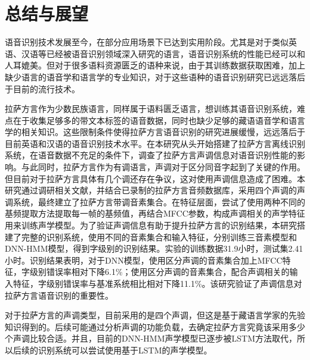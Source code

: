 ﻿%

\chapter{总结与展望}
语音识别技术发展至今，在部分应用场景下已达到实用阶段。尤其是对于类似英语、汉语等已经被语音识别领域深入研究的语言，语音识别系统的性能已经可以和人耳媲美。但对于很多语料资源匮乏的语种来说，由于其训练数据获取困难，加上缺少语言的语音学和语言学的专业知识，对于这些语种的语音识别研究已远远落后于目前的流行技术。

拉萨方言作为少数民族语言，同样属于语料匮乏语言，想训练其语音识别系统，难点在于收集足够多的带文本标签的语音数据，同时也缺少足够的藏语语音学和语言学的相关知识。这些限制条件使得拉萨方言语音识别的研究进展缓慢，远远落后于目前英语和汉语的语音识别技术水平。在本研究从头开始搭建了拉萨方言离线识别系统，在语音数据不充足的条件下，调查了拉萨方言声调信息对语音识别性能的影响。与此同时，拉萨方言作为有调语言，声调对于区分同音字起到了关键的作用。但目前对于拉萨方言具体有几个调还存在争议，这对使用声调信息造成了困难。本研究通过调研相关文献，并结合已录制的拉萨方言音频数据库，采用四个声调的声调系统，最终建立了拉萨方言带调音素集合。在特征层面，尝试了使用两种不同的基频提取方法提取每一帧的基频值，再结合MFCC参数，构成声调相关的声学特征用来训练声学模型。为了验证声调信息有助于提升拉萨方言的识别结果，本研究搭建了完整的识别系统，使用不同的音素集合和输入特征，分别训练三音素模型和DNN-HMM模型，得到字级别的识别结果。实验的训练数据31.9小时，测试集2.41小时。识别结果表明，对于DNN模型，使用区分声调的音素集合加上MFCC特征，字级别错误率相对下降6.1\%；使用区分声调的音素集合，配合声调相关的输入特征，字级别错误率与基准系统相比相对下降11.1\%。该研究验证了声调信息对拉萨方言语音识别的重要性。

对于拉萨方言的声调类型，目前采用的是四个声调，但这是基于藏语言学家的先验知识得到的。后续可能通过分析声调的功能负载，去确定拉萨方言究竟该采用多少个声调比较合适。并且，目前的DNN-HMM声学模型已逐步被LSTM方法取代，所以后续的识别系统可以尝试使用基于LSTM的声学模型。
